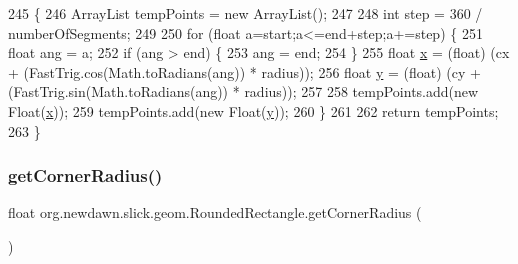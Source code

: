 \begin{DoxyCode}
245                                                                                                            
         \{
246         ArrayList tempPoints = \textcolor{keyword}{new} ArrayList();
247 
248         \textcolor{keywordtype}{int} step = 360 / numberOfSegments;
249         
250         \textcolor{keywordflow}{for} (\textcolor{keywordtype}{float} a=start;a<=end+step;a+=step) \{
251             \textcolor{keywordtype}{float} ang = a;
252             \textcolor{keywordflow}{if} (ang > end) \{
253                 ang = end;
254             \}
255             \textcolor{keywordtype}{float} \mbox{\hyperlink{classorg_1_1newdawn_1_1slick_1_1geom_1_1_shape_a3e985bfff386c15a4efaad03d8ad60d3}{x}} = (float) (cx + (FastTrig.cos(Math.toRadians(ang)) * radius));
256             \textcolor{keywordtype}{float} \mbox{\hyperlink{classorg_1_1newdawn_1_1slick_1_1geom_1_1_shape_a9f934baded6a1b65ebb69e7e5f80ea00}{y}} = (float) (cy + (FastTrig.sin(Math.toRadians(ang)) * radius));
257             
258             tempPoints.add(\textcolor{keyword}{new} Float(\mbox{\hyperlink{classorg_1_1newdawn_1_1slick_1_1geom_1_1_shape_a3e985bfff386c15a4efaad03d8ad60d3}{x}}));
259             tempPoints.add(\textcolor{keyword}{new} Float(\mbox{\hyperlink{classorg_1_1newdawn_1_1slick_1_1geom_1_1_shape_a9f934baded6a1b65ebb69e7e5f80ea00}{y}}));
260         \}
261         
262         \textcolor{keywordflow}{return} tempPoints;
263     \}
\end{DoxyCode}
\mbox{\label{classorg_1_1newdawn_1_1slick_1_1geom_1_1_rounded_rectangle_a3844a9c28a9f85a0becb095e6c6cac9d}} 
\subsubsection{\texorpdfstring{get\+Corner\+Radius()}{getCornerRadius()}}
{\footnotesize\ttfamily float org.\+newdawn.\+slick.\+geom.\+Rounded\+Rectangle.\+get\+Corner\+Radius (\begin{DoxyParamCaption}{ }\end{DoxyParamCaption})\hspace{0.3cm}{\ttfamily [inline]}}

